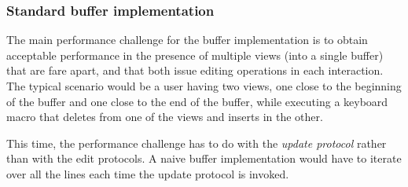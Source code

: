 \subsubsection{Standard buffer implementation}

The main performance challenge for the buffer implementation is to
obtain acceptable performance in the presence of multiple views (into
a single buffer) that are fare apart, and that both issue editing
operations in each interaction.  The typical scenario would be a user
having two views, one close to the beginning of the buffer and one
close to the end of the buffer, while executing a keyboard macro that
deletes from one of the views and inserts in the other.

This time, the performance challenge has to do with the \emph{update
  protocol} rather than with the edit protocols.  A naive buffer
implementation would have to iterate over all the lines each time the
update protocol is invoked.
